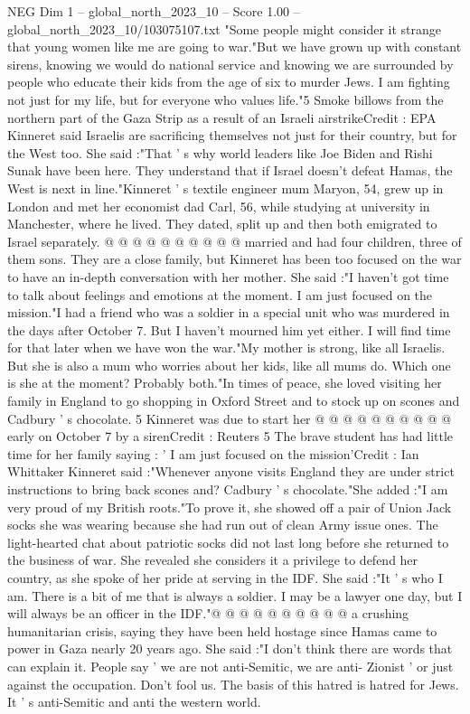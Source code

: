 \begin{textsample}{NEG Dim 1 – global\_north\_2023\_10 – Score 1.00 – global\_north\_2023\_10/103075107.txt}  \label{ex:f1_neg_314}
"Some people might consider it strange that young women like me are going to war."But we have grown up with constant sirens, knowing we would do national service and knowing we are surrounded by people who educate their kids from the age of six to murder Jews.
I am fighting not just for my life, but for everyone who values life."5 Smoke billows from the northern part of the Gaza Strip as a result of an Israeli airstrikeCredit : EPA Kinneret said Israelis are sacrificing themselves not just for their country, but for the West too.
She said :"That ' s why world leaders like Joe Biden and Rishi Sunak have been here.
They understand that if Israel doesn't defeat Hamas, the West is next in line."Kinneret ' s textile engineer mum Maryon, 54, grew up in London and met her economist dad Carl, 56, while studying at university in Manchester, where he lived.
They dated, split up and then both emigrated to Israel separately. @ @ @ @ @ @ @ @ @ @ married and had four children, three of them sons.
They are a close family, but Kinneret has been too focused on the war to have an in-depth conversation with her mother.
She said :"I haven't got time to talk about feelings and emotions at the moment.
I am just focused on the mission."I had a friend who was a soldier in a special unit who was murdered in the days after October 7.
But I haven't mourned him yet either.
I will find time for that later when we have won the war."My mother is strong, like all Israelis.
But she is also a mum who worries about her kids, like all mums do.
Which one is she at the moment?
Probably both."In times of peace, she loved visiting her family in England to go shopping in Oxford Street and to stock up on scones and Cadbury ' s chocolate. 5 Kinneret was due to start her @ @ @ @ @ @ @ @ @ @ early on October 7 by a sirenCredit : Reuters 5 The brave student has had little time for her family saying : ' I am just focused on the mission'Credit : Ian Whittaker Kinneret said :"Whenever anyone visits England they are under strict instructions to bring back scones and?
Cadbury ' s chocolate."She added :"I am very proud of my British roots."To prove it, she showed off a pair of Union Jack socks she was wearing because she had run out of clean Army issue ones.
The light-hearted chat about patriotic socks did not last long before she returned to the business of war.
She revealed she considers it a privilege to defend her country, as she spoke of her pride at serving in the IDF.
She said :"It ' s who I am.
There is a bit of me that is always a soldier.
I may be a lawyer one day, but I will always be an officer in the IDF."@ @ @ @ @ @ @ @ @ @ a crushing humanitarian crisis, saying they have been held hostage since Hamas came to power in Gaza nearly 20 years ago.
She said :"I don't think there are words that can explain it.
People say ' we are not anti-Semitic, we are anti- Zionist ' or just against the occupation.
Don't fool us.
The basis of this hatred is hatred for Jews.
It ' s anti-Semitic and anti the western world.

\end{textsample}
